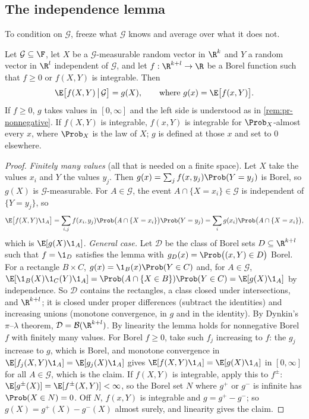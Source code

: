 
\subsection{The independence lemma}

To condition on $\mathcal G$, freeze what $\mathcal G$ knows and average over what it does
not.

\begin{lemma}\label{lem:pr-independence}
Let $\mathcal G\subseteq\F$, let $X$ be a $\mathcal G$-measurable random vector in $\R^k$ and
$Y$ a random vector in $\R^l$ independent of $\mathcal G$, and let $f:\R^{k+l}\to\R$ be a
Borel function such that $f\ge0$ or $f(X,Y)$ is integrable. Then
\[
  \E\big[f(X,Y)\,\big|\,\mathcal G\big]=g(X),\qquad\text{where } g(x)=\E\big[f(x,Y)\big] .
\]
If $f\ge0$, $g$ takes values in $[0,\infty]$ and the left side is understood as in
\cref{rem:pr-nonnegative}. If $f(X,Y)$ is integrable, $f(x,Y)$ is integrable for
$\Prob_X$-almost every $x$, where $\Prob_X$ is the law of $X$; $g$ is defined at those $x$
and set to $0$ elsewhere.
\end{lemma}

\begin{proof}
\emph{Finitely many values} (all that is needed on a finite space). Let $X$ take the
values $x_i$ and $Y$ the values $y_j$. Then
$g(x)=\sum_jf(x,y_j)\Prob(Y=y_j)$ is Borel, so $g(X)$ is $\mathcal G$-measurable. For
$A\in\mathcal G$, the event $A\cap\{X=x_i\}\in\mathcal G$ is independent of $\{Y=y_j\}$, so
\[
  \E\big[f(X,Y)\1_A\big]=\sum_{i,j}f(x_i,y_j)\Prob\big(A\cap\{X=x_i\}\big)\Prob(Y=y_j)
  =\sum_ig(x_i)\Prob\big(A\cap\{X=x_i\}\big),
\]
which is $\E[g(X)\1_A]$. \emph{General case.} Let $\mathcal D$ be the class of Borel sets
$D\subseteq\R^{k+l}$ such that $f=\1_D$ satisfies the lemma with
$g_D(x)=\Prob\big((x,Y)\in D\big)$ Borel. For a rectangle $B\times C$,
$g(x)=\1_B(x)\Prob(Y\in C)$ and, for $A\in\mathcal G$,
$\E[\1_B(X)\1_C(Y)\1_A]=\Prob(A\cap\{X\in B\})\Prob(Y\in C)=\E[g(X)\1_A]$ by independence. So
$\mathcal D$ contains the rectangles, a class closed under intersections, and $\R^{k+l}$; it
is closed under proper differences (subtract the identities) and increasing unions
(monotone convergence, in $g$ and in the identity). By Dynkin's $\pi$--$\lambda$ theorem,
$\mathcal D=\mathcal B(\R^{k+l})$. By linearity the lemma holds for nonnegative Borel $f$
with finitely many values. For Borel $f\ge0$, take such $f_j$ increasing to $f$: the $g_j$
increase to $g$, which is Borel, and monotone convergence in
$\E[f_j(X,Y)\1_A]=\E[g_j(X)\1_A]$ gives $\E[f(X,Y)\1_A]=\E[g(X)\1_A]$ in $[0,\infty]$ for
all $A\in\mathcal G$, which is the claim. If $f(X,Y)$ is integrable, apply this to $f^\pm$:
$\E[g^\pm(X)]=\E[f^\pm(X,Y)]<\infty$, so the Borel set $N$ where $g^+$ or $g^-$ is infinite
has $\Prob(X\in N)=0$. Off $N$, $f(x,Y)$ is integrable and $g=g^+-g^-$; so $g(X)=g^+(X)-g^-(X)$
almost surely, and linearity gives the claim.
\end{proof}


